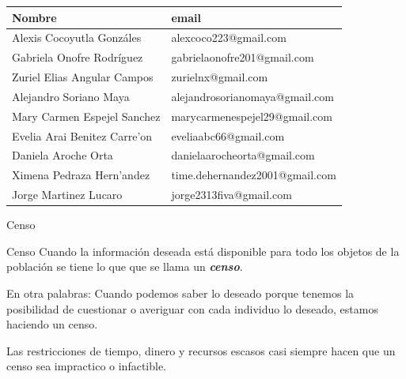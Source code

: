 \documentclass[11pt]{beamer}
\begin{document}
    \begin{frame}{}
      \centering
      \begin{tabular}{|l|l|}
          \hline
          Nombre & email \\
          \hline
          Alexis Cocoyutla Gonzáles    & alexcoco223@gmail.com \\
          \hline
          Gabriela Onofre Rodríguez    & gabrielaonofre201@gmail.com \\
          \hline
          Zuriel Elias Angular Campos  & zurielnx@gmail.com \\
          \hline
          Alejandro Soriano Maya       & alejandrosorianomaya@gmail.com \\
          \hline
          Mary Carmen Espejel Sanchez  & marycarmenespejel29@gmail.com \\
          \hline
          Evelia Arai Benitez Carre'on & eveliaabc66@gmail.com \\
          \hline
          Daniela Aroche Orta          & danielaarocheorta@gmail.com \\
          \hline
          Ximena Pedraza Hern'andez    & time.dehernandez2001@gmail.com \\
          \hline
          Jorge Martinez Lucaro        & jorge2313fiva@gmail.com \\
          \hline

      \end{tabular}
    \end{frame}


    \begin{frame}{Censo}
        \begin{block}{Censo}
          Cuando la información deseada está disponible para todo los objetos de la población se tiene lo que que se llama un \textit{\textbf{censo}}.
        \end{block}
    \pause
    \vspace*{10pt}
    En otra palabras: Cuando podemos saber lo deseado porque tenemos la posibilidad de cuestionar o averiguar con cada individuo lo deseado, estamos haciendo un censo.
    \vspace*{10pt}

    Las restricciones de tiempo, dinero y recursos escasos casi siempre hacen que un censo sea impractico o infactible.
    \end{frame}
\end{document}
